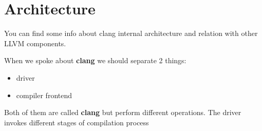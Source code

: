 \chapter{Architecture}

You can find some info about clang internal architecture and relation
with other LLVM components.

When we spoke about \textbf{clang} we should separate 2 things:
\begin{itemize}
\item driver
\item compiler frontend 
\end{itemize}
Both of them are called \textbf{clang} but perform different
operations. The driver invokes different stages of compilation process 
